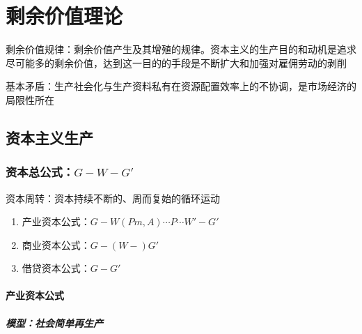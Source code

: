 \documentclass[12pt]{book}
\begin{document}
\chapter{剩余价值理论}




剩余价值规律：剩余价值产生及其增殖的规律。资本主义的生产目的和动机是追求尽可能多的剩余价值，达到这一目的的手段是不断扩大和加强对雇佣劳动的剥削

基本矛盾：生产社会化与生产资料私有在资源配置效率上的不协调，是市场经济的局限性所在




\section{资本主义生产}






\subsection{资本总公式：$G-W-G'$}

\par 资本周转：资本持续不断的、周而复始的循环运动
\begin{enumerate}[(1)]
    \item 产业资本公式：$G-W(Pm,A)\cdots P\cdots W′-G′$
    \item 商业资本公式：$G-(W-)G'$
    \item 借贷资本公式：$G-G'$
\end{enumerate}


\subsubsection{产业资本公式}



\paragraph{模型：社会简单再生产}
\end{document}
